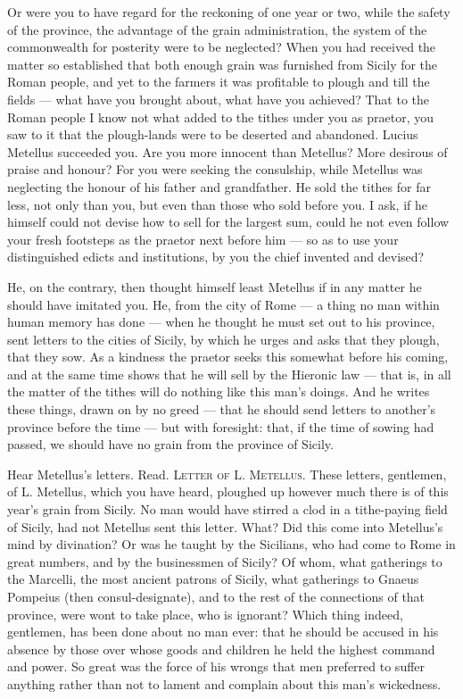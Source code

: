  Or were you to have regard for the reckoning of one year or two, while the safety of the province, the advantage of the grain administration, the system of the commonwealth for posterity were to be neglected? When you had received the matter so established that both enough grain was furnished from Sicily for the Roman people, and yet to the farmers it was profitable to plough and till the fields --- what have you brought about, what have you achieved? That to the Roman people I know not what added to the tithes under you as praetor, you saw to it that the plough-lands were to be deserted and abandoned. Lucius Metellus succeeded you. Are you more innocent than Metellus? More desirous of praise and honour? For you were seeking the consulship, while Metellus was neglecting the honour of his father and grandfather. He sold the tithes for far less, not only than you, but even than those who sold before you. I ask, if he himself could not devise how to sell for the largest sum, could he not even follow your fresh footsteps as the praetor next before him --- so as to use your distinguished edicts and institutions, by you the chief invented and devised?

 He, on the contrary, then thought himself least Metellus if in any matter he should have imitated you. He, from the city of Rome --- a thing no man within human memory has done --- when he thought he must set out to his province, sent letters to the cities of Sicily, by which he urges and asks that they plough, that they sow. As a kindness the praetor seeks this somewhat before his coming, and at the same time shows that he will sell by the Hieronic law --- that is, in all the matter of the tithes will do nothing like this man's doings. And he writes these things, drawn on by no greed --- that he should send letters to another's province before the time --- but with foresight: that, if the time of sowing had passed, we should have no grain from the province of Sicily.

 Hear Metellus's letters. Read. \textsc{Letter of L. Metellus}. These letters, gentlemen, of L. Metellus, which you have heard, ploughed up however much there is of this year's grain from Sicily. No man would have stirred a clod in a tithe-paying field of Sicily, had not Metellus sent this letter. What? Did this come into Metellus's mind by divination? Or was he taught by the Sicilians, who had come to Rome in great numbers, and by the businessmen of Sicily? Of whom, what gatherings to the Marcelli, the most ancient patrons of Sicily, what gatherings to Gnaeus Pompeius (then consul-designate), and to the rest of the connections of that province, were wont to take place, who is ignorant? Which thing indeed, gentlemen, has been done about no man ever: that he should be accused in his absence by those over whose goods and children he held the highest command and power. So great was the force of his wrongs that men preferred to suffer anything rather than not to lament and complain about this man's wickedness.

